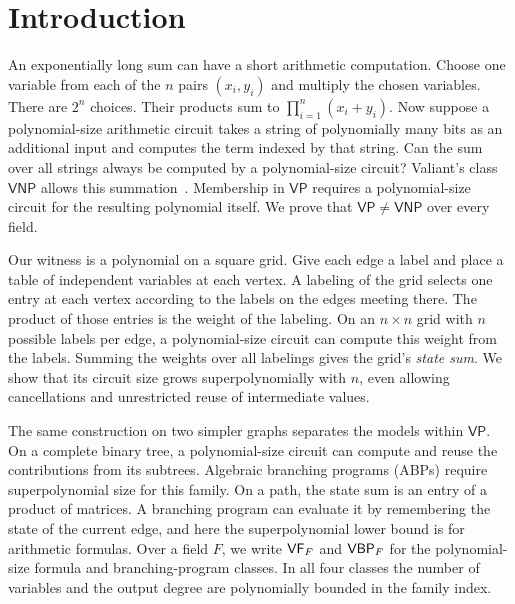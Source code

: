 \section{Introduction}\label{sec:introduction}

An exponentially long sum can have a short arithmetic computation.
Choose one variable from each of the \(n\) pairs \((x_i,y_i)\) and
multiply the chosen variables. There are \(2^n\) choices. Their
products sum to \(\prod_{i=1}^n(x_i+y_i)\).
Now suppose a polynomial-size arithmetic circuit takes a string of
polynomially many bits as an additional input and computes the term
indexed by that string. Can the sum over all strings always be
computed by a polynomial-size circuit? Valiant's class
\(\mathsf{VNP}\) allows this summation~\cite{Valiant}. Membership in
\(\mathsf{VP}\) requires a polynomial-size circuit for the resulting
polynomial itself. We prove that \(\mathsf{VP}\ne\mathsf{VNP}\) over
every field.

Our witness is a polynomial on a square grid. Give each edge a label
and place a table of independent variables at each vertex. A labeling
of the grid selects one entry at each vertex according to the labels
on the edges meeting there. The product of those entries is the
weight of the labeling. On an \(n\times n\) grid with \(n\) possible
labels per edge, a polynomial-size circuit can compute this weight
from the labels. Summing the weights over all labelings gives the
grid's \emph{state sum}. We show that its circuit size grows
superpolynomially with \(n\), even allowing cancellations and
unrestricted reuse of intermediate values.

The same construction on two simpler graphs separates the models
within \(\mathsf{VP}\). On a complete binary tree, a polynomial-size
circuit can compute and reuse the contributions from its subtrees.
Algebraic branching programs (ABPs) require superpolynomial size for
this family. On a path, the state sum is an entry of a product of
matrices. A branching program can evaluate it by remembering the
state of the current edge, and here the superpolynomial lower bound
is for arithmetic formulas. Over a field \(F\), we write \(\mathsf{VF}_F\)
and \(\mathsf{VBP}_F\) for the polynomial-size formula and branching-program
classes. In all four classes the number of variables and the output
degree are polynomially bounded in the family index.

